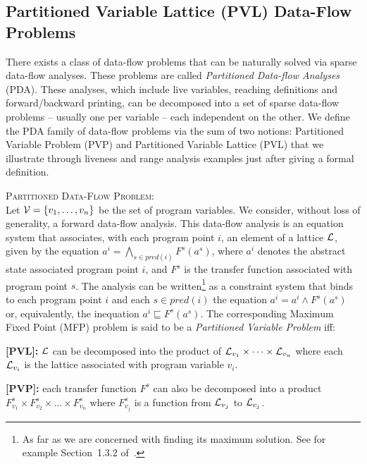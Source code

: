 \subsection{Partitioned Variable Lattice (PVL) Data-Flow Problems}
\label{sec:ssi:pereira:pvpPvl}

There exists a class of data-flow problems that can be naturally solved via sparse data-flow analyses.
These problems are called {\em Partitioned Data-flow Analyses} (PDA).
These analyses, which include live variables, reaching definitions and forward/backward printing, can be decomposed into a set of sparse data-flow problems -- usually one per variable -- each independent on the other.
We define the PDA family of data-flow problems via the sum of two notions: Partitioned Variable Problem (PVP) and Partitioned Variable Lattice (PVL) that we illustrate through liveness and range analysis examples just after giving a formal definition.

\begin{definition}
\label{pro:pvp}
\textsc{Partitioned Data-Flow Problem}:\\Let ${\cal V}=\{v_1,\dots,v_n\}$ be the set of program variables.
We consider, without loss of generality, a forward data-flow analysis.
This data-flow analysis is an equation system that associates, with each program point $i$, an element of a lattice ${\cal L}$, given by the equation $a^i = \bigwedge_{s \in \mathit{pred}(i)} F^s(a^s)$, where $a^i$ denotes the abstract state associated  program point $i$, and $F^s$ is the transfer function associated with program point $s$.
The analysis can be written\footnote{As far as we are concerned with finding its maximum solution. See for example Section~1.3.2 of~\cite{Nielson05}.} as a constraint system that binds to each program point $i$ and each $s\in \mathit{pred}(i)$ the equation $a^i = a^i \wedge  F^s(a^s)$ or, equivalently, the inequation $a^i \sqsubseteq  F^s(a^s)$.
The corresponding Maximum Fixed Point (MFP) problem is said to be a \emph{Partitioned Variable Problem} iff:
\begin{description}
\item {\bf [PVL]:} $\cal L$ can be decomposed into the product of ${\cal L}_{v_1}\times \dots \times {\cal L}_{v_n}$ where each ${\cal L}_{v_i}$ is the lattice associated with program variable $v_i$.
\item {\bf [PVP]:} each transfer function $F^s$ can also be decomposed into a product $F_{v_1}^s\times F_{v_2}^s \times \dots \times F_{v_n}^s$ where $F_{v_j}^s$ is a function from ${\cal L}_{v_j}$ to ${\cal L}_{v_j}$.
\end{description}
\end{definition}

